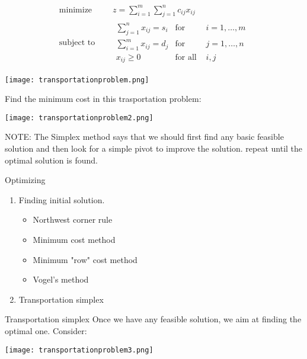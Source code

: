 \documentclass[c]{beamer}
\begin{document}
\begin{frame}
  \begin{equation*}
    \begin{aligned}
      \text{minimize } \quad & z = \sum_{i=1}^m \sum_{j=1}^n c_{ij}x_{ij} \\
      \text{subject to }\quad &
      \begin{array}{rcl}
        \sum_{j=1}^n x_{ij}= s_i&\text{for }& i=1,\ldots,m \\
        \sum_{i=1}^m x_{ij} = d_j &\text{for }& j=1,\ldots,n \\
        x_{ij} \geq 0 & \text{for all } & i,j
      \end{array}
    \end{aligned}
  \end{equation*}
  \begin{center}
    \texttt{[image: transportationproblem.png]}
  \end{center}
\end{frame}

\begin{frame}
\begin{Exercise}
  Find the minimum cost in this trasportation problem:
  \begin{center}
    \texttt{[image: transportationproblem2.png]}
  \end{center}
  NOTE: The Simplex method says that we should first find any basic feasible solution and then look for a simple pivot to improve the solution. repeat until the optimal solution is found.
\end{Exercise}
\end{frame}

\begin{frame}{Optimizing}
\begin{enumerate}
  \item Finding initial solution.
  \begin{itemize}
  \item Northwest corner rule
  \item Minimum cost method
  \item Minimum "row" cost method
  \item Vogel's method
  \end{itemize}
  \item Transportation simplex
\end{enumerate}
\end{frame}

\begin{frame}{Transportation simplex}
  Once we have any feasible solution, we aim at finding the optimal one. Consider:
  \begin{center}
    \texttt{[image: transportationproblem3.png]}
  \end{center}

\end{frame}
\end{document}
